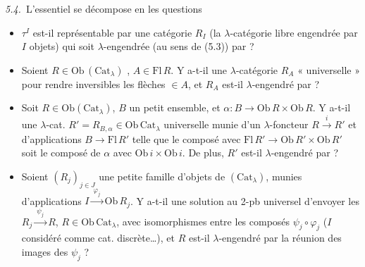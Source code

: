 \documentclass[11pt,a4paper]{article}
\begin{document}

\emph{5.4.}\ L'essentiel \struck{\ill{}} se décompose en les questions

\begin{itemize}
  \item[a')] $\tau^{I}$ est-il représentable par une catégorie $R_{I}$
    (la $\lambda$-catégorie libre engendrée par $I$ objets) qui soit
    $\lambda$-engendrée (au sens de (5.3)) par
     ?
  \item[b')] Soient $R \in \mathrm{Ob}\,(\mathrm{Cat}_{\lambda})$ ,
    $A \in \mathrm{Fl}\,R$. Y a-t-il une $\lambda$-catégorie $R_{A}$
     « universelle » pour
    rendre inversibles les flèches $\in A$, et $R_{A}$ est-il
    $\lambda$-engendré par  ?
  \item[\uncertain{c'})]  Soit
    $R \in \mathrm{Ob}(\mathrm{Cat}_{\lambda})$, $B$ un \struck{\ill{}}
    petit ensemble, et $\alpha : B \to \mathrm{Ob}\,R
    \times \mathrm{Ob}\,R$. \struck{\ill{}} Y a-t-il une $\lambda$-cat.
    $R' = R_{B,\alpha} \in \mathrm{Ob}\,\mathrm{Cat}_{\lambda}$
    universelle \struck{\ill{}} munie d'un $\lambda$-foncteur
    $R \xrightarrow{\ i\ } R'$ et d'applications $B \to
    \mathrm{Fl}\,R'$  telle que le composé avec $\mathrm{Fl}\,R' \to
    \mathrm{Ob}\,R' \times \mathrm{Ob}\,R'$ soit le composé de $\alpha$
    avec $\mathrm{Ob}\,i \times \mathrm{Ob}\,i$. De plus, $R'$ est-il
    $\lambda$-engendré par  ?
  \item[d')] Soient $(R_{j})_{j \in J}$ une petite famille d'objets de
    $(\mathrm{Cat}_{\lambda})$, munies d'applications $I
    \xrightarrow{\ \varphi_{j}\ } \mathrm{Ob}\,R_{j}$. Y a-t-il une
    solution au 2-pb universel d'envoyer les $R_{j}
    \xrightarrow{\ \psi_{j}\ } R$, $R \in \mathrm{Ob}\,\mathrm{Cat}_{\lambda}$,
    avec   
    isomorphismes entre les composés \struck{\ill{}} $\psi_{j} \circ \varphi_{j}$
    ($I$ considéré comme cat. discrète…), et $R$ est-il
    $\lambda$-engendré par la réunion des images des $\psi_{j}$ ?
\end{itemize}
\end{document}
